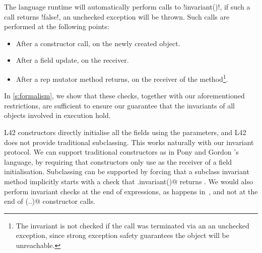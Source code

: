 The language runtime will automatically perform calls to \Q!invariant()!, if such a call returns \Q!false!, an unchecked exception will be thrown. Such calls are performed at the following points:
\begin{itemize}
	\item After a constructor call, on the newly created object.
	\item After a field update, on the receiver.
	\item After a rep mutator method returns, on the receiver of the method\footnote{The invariant is not checked if the call was terminated via an an unchecked exception, since strong exception safety guarantees the object will be unreachable.}.
\end{itemize}
\noindent In \autoref{s:formalism}, we show that these checks, together with our aforementioned restrictions, are sufficient to ensure our guarantee that the invariants of all objects involved in execution hold. %

L42 constructors directly initialise all the fields using the parameters, and L42 does not provide traditional subclassing.
This works naturally with our invariant protocol.
We can support traditional constructors as in Pony and Gordon \etal's language, 
by requiring that constructors only use \Q@this@ as the receiver of a field initialisation.
Subclassing can be supported by forcing that a subclass invariant method implicitly starts with a check that \Q@super.invariant()@ returns \Q@true@. We would also perform invariant checks at the end of \Q@new@ expressions, as happens in~\cite{feldman2006jose}, and not at the end of \Q@super(..)@ constructor calls.
